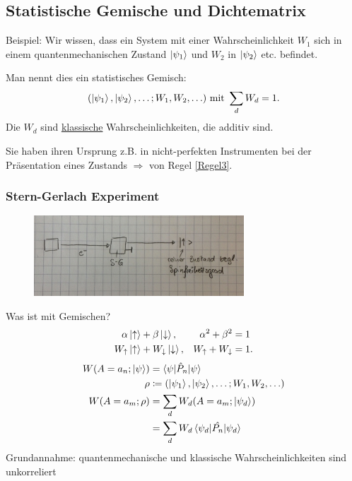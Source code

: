 \subsection{Statistische Gemische und Dichtematrix}
	Beispiel: Wir wissen, dass ein System mit einer Wahrscheinlichkeit $W_1$ sich in einem quantenmechanischen Zustand $\ket{\psi_1}$ und $W_2$ in $\ket{\psi_2}$ etc. befindet.
	
	Man nennt dies ein statistisches Gemisch:
		\begin{align*}
			(\ket{\psi_1}, \ket{\psi_2}, \ldots; W_1, W_2, \ldots) \text{ mit } \sum_d W_{d} = 1.
		\end{align*}
	Die $W_d$ sind \underline{klassische} Wahrscheinlichkeiten, die additiv sind. 
	
	Sie haben ihren Ursprung z.B. in nicht-perfekten Instrumenten bei der Präsentation eines Zustands
	$\Rightarrow$ von Regel \ref{Regel3}.
	\subsubsection*{Stern-Gerlach Experiment}
		\begin{figure} [h]
			\begin{center}
				\includegraphics[width=0.7\textwidth]{Statistische_Gemische_und_Dichtematrix1}
			\end{center}
		\end{figure}
	Was ist mit Gemischen?
	\begin{align*}
		\alpha \ket{\uparrow} &+ \beta \ket{\downarrow},& \alpha^2 + \beta^2 &= 1 \\
		W_\uparrow\ket{\uparrow} &+ W_\downarrow \ket{\downarrow},& W_\uparrow + W_\downarrow &= 1.
	\end{align*}
	\begin{align*}
		W(A = a_n; \ket{\psi}) &= \braket{\psi | \hat{P}_n | \psi} \\
		\rho &\coloneqq (\ket{\psi_1}, \ket{\psi_2}, \ldots; W_1, W_2, \ldots) \\
		W(A=a_m; \rho) &= \sum_{d} W_d (A = a_m ; \ket{\psi_d}) \\
		&= \sum_d W_d \braket{\psi_d | \hat{P_n} | \psi_d} 
	\end{align*}
	Grundannahme: quantenmechanische und klassische Wahrscheinlichkeiten sind unkorreliert
	
